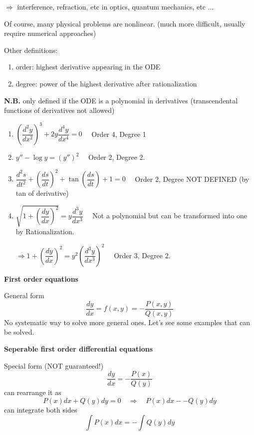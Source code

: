 \documentclass{article}
\begin{document}
$\Rightarrow$ interference, refraction, etc in optics, quantum mechanics, etc ...

\noindent
Of course, many physical problems are nonlinear. (much more difficult, usually require numerical approaches)

\vspace{2mm}\noindent
Other definitions:
\begin{enumerate}
    \item order: highest derivative appearing in the ODE
    \item degree: power of the highest derivative after rationalization
\end{enumerate}

\noindent
\textbf{N.B.} only defined if the ODE is a polynomial in derivatives (transcendental functions of derivatives not allowed)

\begin{enumerate}
    \item $\left( \dfrac{d^2 y}{dx^2} \right)^3 + 2y \dfrac{d^4 y}{dx^4} = 0 \quad $ Order 4, Degree 1
    \item $y'' - \log y = (y'')^2 \quad $ Order 2, Degree 2.
    \item $\dfrac{d^2 s}{dt^2} + \left( \dfrac{ds}{dt} \right)^2 + \tan \left( \dfrac{ds}{dt} \right) + 1 = 0 \quad $ Order 2, Degree NOT DEFINED (by tan of derivative)
    \item $\sqrt{1 + \left( \dfrac{dy}{dx} \right)^2} = y \dfrac{d^3 y}{dx^3} \quad $ Not a polynomial but can be transformed into one by \color{red} Rationalization. \color{black}

    $ \Rightarrow 1 + \left( \dfrac{dy}{dx} \right)^2 = y^2 \left( \dfrac{d^3 y}{dx^3} \right)^2 \quad $ Order 3, Degree 2.
\end{enumerate}

\vspace{2mm}\noindent
\textbf{First order equations}

\noindent General form
\begin{equation}
    \frac{dy}{dx} = f(x, y) = -\frac{P(x, y)}{Q(x, y)}
\end{equation}
No systematic way to solve more general ones. Let's see some examples that can be solved.

\vspace{2mm}\noindent
\textbf{Seperable first order differential equations}

\noindent
Special form (NOT guaranteed!)
\begin{equation}
    \frac{dy}{dx} = - \frac{P(x)}{Q(y)}
\end{equation}
can rearrange it as
\begin{equation}
    P(x) dx + Q(y)dy = 0 \quad \Rightarrow \quad P(x)dx - -Q(y)dy
\end{equation}
can integrate both sides
\begin{equation}
    \int P(x)dx = - \int Q(y)dy
\end{equation}
\end{document}
